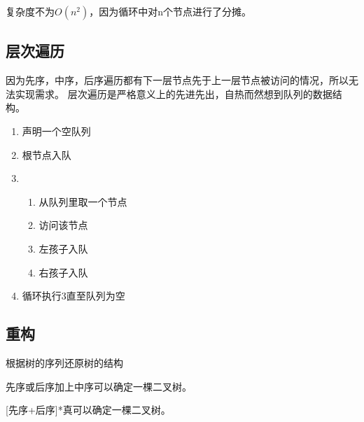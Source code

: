 \documentclass{article}
\begin{document}
复杂度不为$O(n^2)$，因为循环中对n个节点进行了分摊。

\subsection{层次遍历}
因为先序，中序，后序遍历都有下一层节点先于上一层节点被访问的情况，所以无法实现需求。
层次遍历是严格意义上的先进先出，自热而然想到队列的数据结构。

\begin{enumerate}
  \item 声明一个空队列
  \item 根节点入队
  \item \begin{enumerate}
          \item 从队列里取一个节点
          \item 访问该节点
          \item 左孩子入队
          \item 右孩子入队
        \end{enumerate}
  \item 循环执行3直至队列为空
\end{enumerate}

\subsection{重构}
根据树的序列还原树的结构

先序或后序加上中序可以确定一棵二叉树。

[先序+后序]*真可以确定一棵二叉树。
\end{document}
